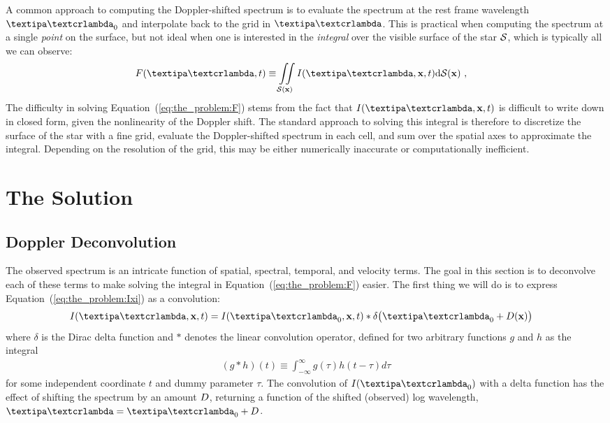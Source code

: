 \documentclass[modern]{aastex631}
\begin{document}
A common approach to computing the Doppler-shifted spectrum is to evaluate the spectrum at the rest frame wavelength $\lnlam_0$ and interpolate back to the grid in $\lnlam$. 
This is practical when computing the spectrum at a single \emph{point} on the surface, but not ideal when one is interested in the \emph{integral} over the visible surface of the star $\mathcal{S}$, which is typically all we can observe:
%
\begin{align}
    \label{eq:the_problem:F}
    F(\lnlam, t)
     & \equiv
    \iint\limits_{\Surf(\x)}
    I(\lnlam, \x, t)
    \mathrm{d}{\Surf(\x)}
    \quad,
\end{align}
%
The difficulty in solving Equation~(\ref{eq:the_problem:F}) stems from the fact that $I(\lnlam, \x, t)$ is difficult to write down in closed form, given the nonlinearity of the Doppler shift.
The standard approach to solving this integral is therefore to discretize the surface of the star with a fine grid, evaluate the Doppler-shifted spectrum in each cell, and sum over the spatial axes to approximate the integral. 
Depending on the resolution of the grid, this may be either numerically inaccurate or computationally inefficient.

\section{The Solution}
\label{sec:the_solution}

\subsection{Doppler Deconvolution}

The observed spectrum is an intricate function of spatial, spectral, temporal, and velocity terms. 
The goal in this section is to deconvolve each of these terms to make solving the integral in Equation~(\ref{eq:the_problem:F}) easier.
%
The first thing we will do is to express Equation~(\ref{eq:the_problem:Ixi}) as a convolution:
%
\begin{align}
    \label{eq:deconv:convolution}
    I(\lnlam, \x, t) & =
    I(\lnlam_0, \x, t)
    *
    \delta\big(\lnlam_0 + \D(\x)\big)
\end{align}
%
where $\delta$ is the Dirac delta function and $*$ denotes the linear convolution operator, defined for two arbitrary functions $g$ and $h$ as the integral
%
\begin{align}
    \label{eq:deconv:convolution_def}
    (g * h)(t) \equiv \int_{-\infty}^\infty g(\tau) h(t - \tau) d\tau
\end{align}
%
for some independent coordinate $t$ and dummy parameter $\tau$.
%
The convolution of $I(\lnlam_0)$ with a delta function has the effect of shifting the spectrum by an amount $D$, returning a function of the shifted (observed) log wavelength, $\lnlam = \lnlam_0 + \D$.
\end{document}
